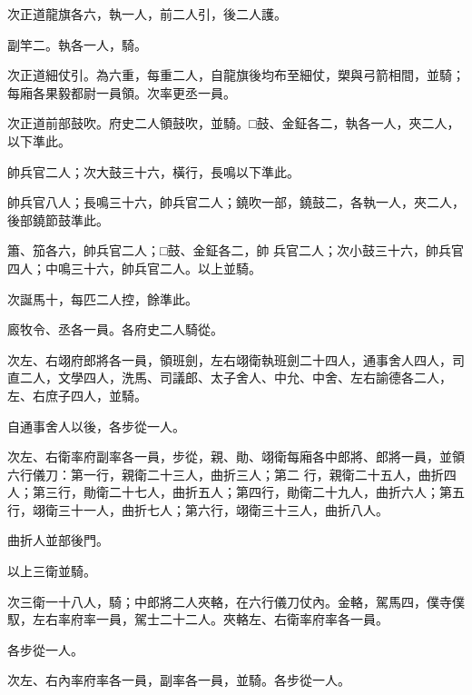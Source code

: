 \begin{pinyinscope}
 次正道龍旗各六，執一人，前二人引，後二人護。



 副竿二。執各一人，騎。



 次正道細仗引。為六重，每重二人，自龍旗後均布至細仗，槊與弓箭相間，並騎；每廂各果毅都尉一員領。次率更丞一員。



 次正道前部鼓吹。府史二人領鼓吹，並騎。□鼓、金鉦各二，執各一人，夾二人，以下準此。



 帥兵官二人；次大鼓三十六，橫行，長鳴以下準此。



 帥兵官八人；長鳴三十六，帥兵官二人；鐃吹一部，鐃鼓二，各執一人，夾二人，後部鐃節鼓準此。



 簫、笳各六，帥兵官二人；□鼓、金鉦各二，帥
 兵官二人；次小鼓三十六，帥兵官四人；中鳴三十六，帥兵官二人。以上並騎。



 次誕馬十，每匹二人控，餘準此。



 廄牧令、丞各一員。各府史二人騎從。



 次左、右翊府郎將各一員，領班劍，左右翊衛執班劍二十四人，通事舍人四人，司直二人，文學四人，洗馬、司議郎、太子舍人、中允、中舍、左右諭德各二人，左、右庶子四人，並騎。



 自通事舍人以後，各步從一人。



 次左、右衛率府副率各一員，步從，親、勛、翊衛每廂各中郎將、郎將一員，並領六行儀刀：第一行，親衛二十三人，曲折三人；第二
 行，親衛二十五人，曲折四人；第三行，勛衛二十七人，曲折五人；第四行，勛衛二十九人，曲折六人；第五行，翊衛三十一人，曲折七人；第六行，翊衛三十三人，曲折八人。



 曲折人並部後門。



 以上三衛並騎。



 次三衛一十八人，騎；中郎將二人夾輅，在六行儀刀仗內。金輅，駕馬四，僕寺僕馭，左右率府率一員，駕士二十二人。夾輅左、右衛率府率各一員。



 各步從一人。



 次左、右內率府率各一員，副率各一員，並騎。各步從一人。




\end{pinyinscope}
